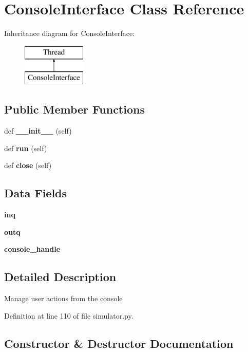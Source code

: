 \section{Console\+Interface Class Reference}
\label{classprotolibs_1_1modbus__tk_1_1simulator_1_1_console_interface}
Inheritance diagram for Console\+Interface\+:\begin{figure}[H]
\begin{center}
\leavevmode
\includegraphics[height=2.000000cm]{classprotolibs_1_1modbus__tk_1_1simulator_1_1_console_interface}
\end{center}
\end{figure}
\subsection*{Public Member Functions}
\begin{DoxyCompactItemize}
\item 
def {\bf \+\_\+\+\_\+init\+\_\+\+\_\+} (self)
\item 
def {\bf run} (self)
\item 
def {\bf close} (self)
\end{DoxyCompactItemize}
\subsection*{Data Fields}
\begin{DoxyCompactItemize}
\item 
{\bf inq}
\item 
{\bf outq}
\item 
{\bf console\+\_\+handle}
\end{DoxyCompactItemize}


\subsection{Detailed Description}
\begin{DoxyVerb}Manage user actions from the console\end{DoxyVerb}
 

Definition at line 110 of file simulator.\+py.



\subsection{Constructor \& Destructor Documentation}
